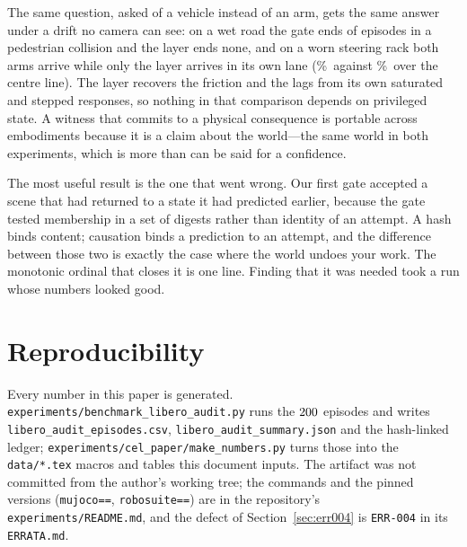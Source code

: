 \documentclass[conference]{IEEEtran}
\theoremstyle{definition}
\newcommand{\code}[1]{\texttt{#1}}
\begin{document}
The same question, asked of a vehicle instead of an arm, gets the same answer
under a drift no camera can see: on a wet road the gate ends \ADWetCollSafe{} of
\ADWetN{} episodes in a pedestrian collision and the layer ends none, and on a
worn steering rack both arms arrive while only the layer arrives in its own lane
(\ADLagPaintSafe\%\ against \ADLagPaintCEL\%\ over the centre line). The layer
recovers the friction and the lags from its own saturated and stepped responses,
so nothing in that comparison depends on privileged state. A witness that commits
to a physical consequence is portable across embodiments because it is a claim
about the world---the same world in both experiments, which is more than can be
said for a confidence.

The most useful result is the one that went wrong. Our first gate accepted a
scene that had returned to a state it had predicted earlier, because the gate
tested membership in a set of digests rather than identity of an attempt. A hash
binds content; causation binds a prediction to an attempt, and the difference
between those two is exactly the case where the world undoes your work. The
monotonic ordinal that closes it is one line. Finding that it was needed took a
run whose numbers looked good.

\section*{Reproducibility}

Every number in this paper is generated.
\code{experiments/benchmark\_libero\_audit.py} runs the
$200$ episodes and writes \code{libero\_audit\_episodes.csv},
\code{libero\_audit\_summary.json} and the hash-linked ledger;
\code{experiments/cel\_paper/make\_numbers.py} turns those into the
\code{data/*.tex} macros and tables this document inputs. The artifact was not
committed from the author's working tree; the commands and the pinned versions
(\code{mujoco==\MujocoVersion}, \code{robosuite==\RobosuiteVersion}) are in the
repository's \code{experiments/README.md}, and the defect of
Section~\ref{sec:err004} is \code{ERR-004} in its \code{ERRATA.md}.



\end{document}
